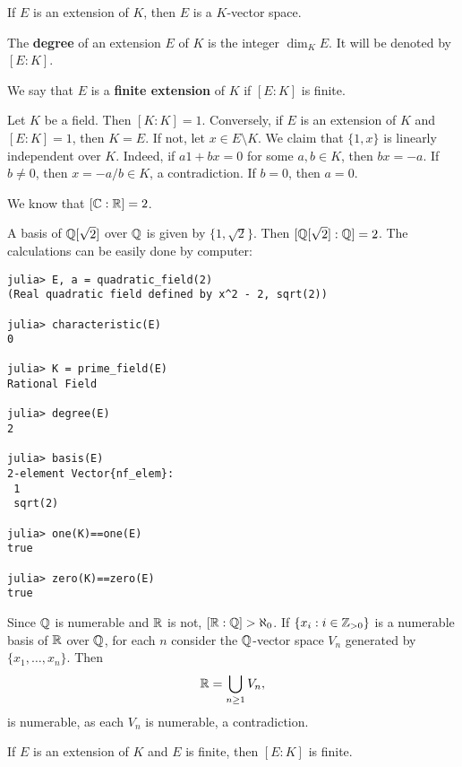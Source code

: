 If $E$ is an extension of $K$, then $E$ is a
$K$-vector space. 

\begin{definition}
	The \textbf{degree} of an extension $E$ of $K$ 
	is the integer $\dim_KE$. It will be denoted by $[E:K]$. 
\end{definition}

We say that $E$ is a \textbf{finite extension} of $K$ 
if $[E:K]$ is finite. 

\begin{example}
	Let $K$ be a field. Then $[K:K]=1$. Conversely, 
	if $E$ is an extension of $K$ and $[E:K]=1$, then $K=E$. 
	If not, let $x\in E\setminus K$. We claim that
	$\{1,x\}$ is linearly independent over $K$. Indeed, 
	if $a1+bx=0$ for some $a,b\in K$, then $bx=-a$. If 
	$b\ne 0$, then $x=-a/b\in K$, a contradiction. If $b=0$, then 
	$a=0$. 
\end{example}

We know that $[\mathbb{C}:\mathbb{R}]=2$. 

\begin{example}
	A basis of $\mathbb{Q}[\sqrt{2}]$ over $\mathbb{Q}$ 
	is given by $\{1,\sqrt{2}\}$. Then 
	$[\mathbb{Q}[\sqrt{2}]:\mathbb{Q}]=2$. The calculations 
	can be easily done by computer: 
\begin{lstlisting}
julia> E, a = quadratic_field(2)
(Real quadratic field defined by x^2 - 2, sqrt(2))

julia> characteristic(E)
0

julia> K = prime_field(E)
Rational Field

julia> degree(E)
2

julia> basis(E)
2-element Vector{nf_elem}:
 1
 sqrt(2)
 
julia> one(K)==one(E)
true

julia> zero(K)==zero(E)
true
\end{lstlisting}
\end{example}

\begin{example}
	Since $\mathbb{Q}$ is numerable and 
	$\mathbb{R}$ is not, $[\mathbb{R}:\mathbb{Q}]>\aleph_0$. If $\{x_i:i\in\mathbb{Z}_{>0}\}$ 
	is a numerable basis of $\mathbb{R}$ over $\mathbb{Q}$, for each
	$n$ consider the $\mathbb{Q}$-vector space
	$V_n$ generated by $\{x_1,\dots,x_n\}$. Then 
	\[
		\mathbb{R}=\bigcup_{n\geq1}V_n,
	\]
	is numerable, as each $V_n$ is numerable, a contradiction.
\end{example}

If $E$ is an extension of $K$ and $E$ is finite,
then $[E:K]$ is finite. 

